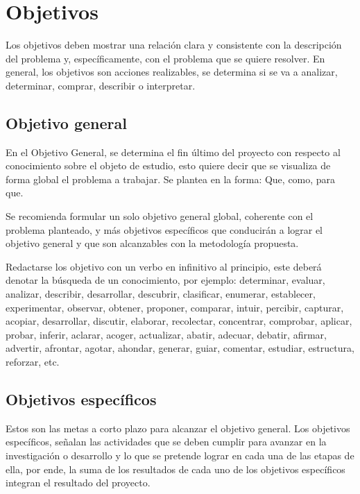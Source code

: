 \section{Objetivos}

Los objetivos deben mostrar una relación clara y consistente con la descripción
del problema y, específicamente, con el problema que se quiere resolver.
En general, los objetivos son acciones realizables, se determina si se va a
analizar, determinar, comprar, describir o interpretar.

\subsection{Objetivo general}  

En el Objetivo General, se determina el fin último del proyecto con respecto al
conocimiento sobre el objeto de estudio, esto quiere decir que se visualiza de
forma global el problema a trabajar. Se plantea en la forma: Que, como, para
que.

Se recomienda formular un solo objetivo general global, coherente con el
problema planteado, y más objetivos específicos que conducirán a lograr el
objetivo general y que son alcanzables con la metodología propuesta.

Redactarse los objetivo con un verbo en infinitivo al principio, este deberá
denotar la búsqueda de un conocimiento, por ejemplo: determinar, evaluar,
analizar, describir, desarrollar, descubrir, clasificar, enumerar, establecer,
experimentar, observar, obtener, proponer, comparar, intuir, percibir, 
capturar, acopiar, desarrollar, discutir, elaborar, recolectar, concentrar,
comprobar, aplicar, probar, inferir, aclarar, acoger, actualizar, abatir, adecuar,
debatir, afirmar, advertir, afrontar, agotar, ahondar, generar, guiar, comentar,
estudiar, estructura, reforzar, etc.

\subsection{Objetivos específicos}  

Estos son las metas a corto plazo para alcanzar el objetivo general.
Los objetivos específicos, señalan las actividades que se deben cumplir para
avanzar en la investigación o desarrollo y lo que se pretende lograr en cada
una de las etapas de ella, por ende, la suma de los resultados de cada uno de
los objetivos específicos integran el resultado del proyecto.

